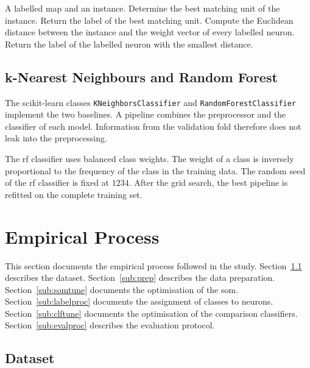 \documentclass[conference]{IEEEtran}
\begin{document}
\begin{algorithm}[!t]
\caption{Class prediction}
\label{alg:predict}
\begin{algorithmic}[1]
\REQUIRE A labelled map and an instance.
\STATE Determine the best matching unit of the instance.
    \STATE Return the label of the best matching unit.
\ELSE
    \STATE Compute the Euclidean distance between the instance and the weight vector of every labelled neuron.
    \STATE Return the label of the labelled neuron with the smallest distance.
\ENDIF
\end{algorithmic}
\end{algorithm}

\subsection{k-Nearest Neighbours and Random Forest}
\label{sub:clfimpl}

The scikit-learn classes \texttt{KNeighborsClassifier} and \texttt{RandomForestClassifier} implement the two baselines.
A pipeline combines the preprocessor and the classifier of each model.
Information from the validation fold therefore does not leak into the preprocessing.

The \gls{rf} classifier uses balanced class weights.
The weight of a class is inversely proportional to the frequency of the class in the training data.
The random seed of the \gls{rf} classifier is fixed at $1234$.
After the grid search, the best pipeline is refitted on the complete training set.


\section{Empirical Process}
\label{sec:empirical}

This section documents the empirical process followed in the study.
Section~\ref{sub:data} describes the dataset.
Section~\ref{sub:prep} describes the data preparation.
Section~\ref{sub:somtune} documents the optimisation of the \gls{som}.
Section~\ref{sub:labelproc} documents the assignment of classes to neurons.
Section~\ref{sub:clftune} documents the optimisation of the comparison classifiers.
Section~\ref{sub:evalproc} describes the evaluation protocol.

\subsection{Dataset}
\label{sub:data}
\end{document}
